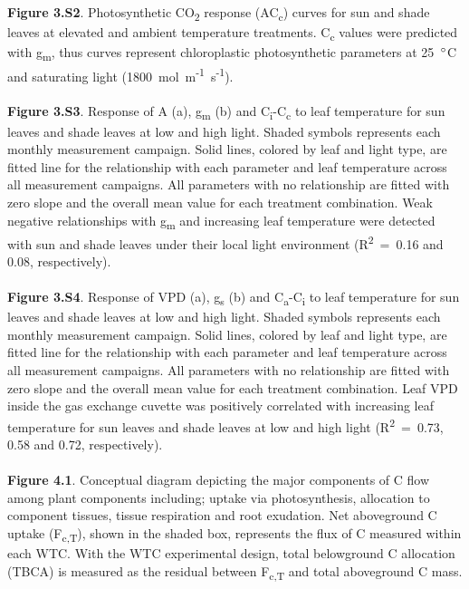 \documentclass[a4paper]{article}\usepackage[]{graphicx}\usepackage[]{color}
\begin{document}
\\
\\
\textbf{Figure 3.S2}. Photosynthetic CO\textsubscript{2} response (AC\textsubscript{c}) curves for sun and shade leaves at elevated and ambient temperature treatments. C\textsubscript{c} values were predicted with g\textsubscript{m}, thus curves represent chloroplastic photosynthetic parameters at 25~$\degree$C and saturating light (1800~{\textmugreek}mol~m\textsuperscript{-1}~s\textsuperscript{-1}). 
\\
\\
\textbf{Figure 3.S3}. Response of A (a), g\textsubscript{m} (b) and C\textsubscript{i}-C\textsubscript{c} to leaf temperature for sun leaves and shade leaves at low and high light. Shaded symbols represents each monthly measurement campaign. Solid lines, colored by leaf and light type, are fitted line for the relationship with each parameter and leaf temperature across all measurement campaigns. All parameters with no relationship are fitted with zero slope and the overall mean value for each treatment combination. Weak negative relationships with g\textsubscript{m} and increasing leaf temperature were detected with sun and shade leaves under their local light environment (R\textsuperscript{2}~=~0.16 and 0.08, respectively). 
\\
\\
\textbf{Figure 3.S4}. Response of VPD (a), g\textsubscript{s} (b) and C\textsubscript{a}-C\textsubscript{i} to leaf temperature for sun leaves and shade leaves at low and high light. Shaded symbols represents each monthly measurement campaign. Solid lines, colored by leaf and light type, are fitted line for the relationship with each parameter and leaf temperature across all measurement campaigns. All parameters with no relationship are fitted with zero slope and the overall mean value for each treatment combination. Leaf VPD inside the gas exchange cuvette was positively correlated with increasing leaf temperature for sun leaves and shade leaves at low and high light (R\textsuperscript{2}~=~0.73, 0.58 and 0.72, respectively).
\\
\\
\textbf{Figure 4.1}. Conceptual diagram depicting the major components of C flow among plant components including; uptake via photosynthesis, allocation to component tissues, tissue respiration and root exudation. Net aboveground C uptake (F\textsubscript{c,T}), shown in the shaded box, represents the flux of C measured within each WTC. With the WTC experimental design, total belowground C allocation (TBCA) is measured as the residual between F\textsubscript{c,T} and total aboveground C mass. 
\end{document}

